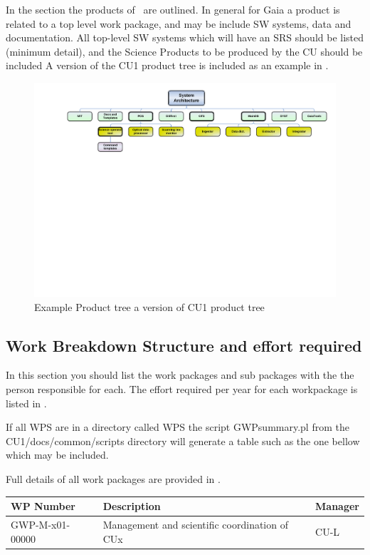 \documentclass[CUx,lsstdraft,SDP]{lsstdoc}
\begin{document}
In the section the products of \CU ~are outlined. In general for Gaia a
product is related to a top level work package, and may be include SW systems, data and documentation. All top-level SW systems which will have an SRS should be listed (minimum detail), and the Science Products to be produced by the CU should be included A version of the CU1 product tree is included as an example in .

\begin{figure}[htbp]
\begin{center}
 \includegraphics[scale=0.5,trim=0 12cm 0 0]{images/cu1Products}
\caption{Example Product tree a version of  CU1 product tree \label{fig:prod}}
\end{center}
\end{figure}


\subsection{Work Breakdown Structure and effort required}

In this section you should list the work packages and sub packages with the
the person responsible for each.  The effort required per year for each
workpackage is listed in .

If all WPS are in a directory called WPS the
script  GWPsummary.pl from the CU1/docs/common/scripts directory will
generate a table such as the one bellow which may be included.

Full details of all work packages are provided in .
\scriptsize
\begin{longtable}{|l|p{}|p{}|}\hline
WP Number & Description & Manager \\\hline
 GWP-M-x01-00000 & Management and scientific coordination of CUx & CU-L\\\hline
\end{longtable}
\normalsize
\end{document}
